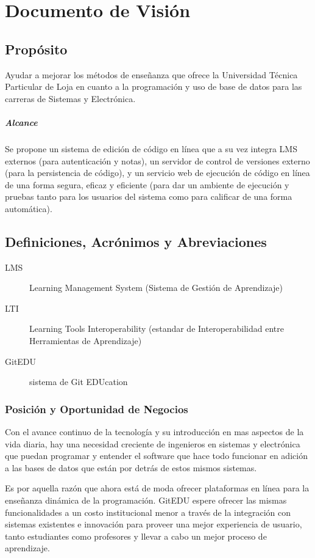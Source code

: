 

\chapter{Documento de Visión}
\label{visionDoc}

\section{Propósito}
Ayudar a mejorar los métodos de enseñanza que ofrece la Universidad Técnica Particular de Loja en cuanto a la programación y uso de base de datos para las carreras de Sistemas y Electrónica.
\paragraph{Alcance}
Se propone un sistema de edición de código en línea que a su vez integra LMS externos (para autenticación y notas), un servidor de control de versiones externo (para la persistencia de código), y un servicio web de ejecución de código en línea de una forma segura, eficaz y eficiente (para dar un ambiente de ejecución y pruebas tanto para los usuarios del sistema como para calificar de una forma automática).
\section{Definiciones, Acrónimos y Abreviaciones}
\begin{description}
	\item[LMS] Learning Management System (Sistema de Gestión de Aprendizaje)
    \item[LTI] Learning Tools Interoperability (estandar de Interoperabilidad entre Herramientas de Aprendizaje)
    \item[GitEDU] sistema de Git EDUcation
\end{description}
\subsection{Posición y Oportunidad de Negocios}
Con el avance continuo de la tecnología y su introducción en mas aspectos de la vida diaria, hay una necesidad creciente de ingenieros en sistemas y electrónica que puedan programar y entender el software que hace todo funcionar en adición a las bases de datos que están por detrás de estos mismos sistemas.
 
Es por aquella razón que ahora está de moda ofrecer plataformas en línea para la enseñanza dinámica de la programación. GitEDU espere ofrecer las mismas funcionalidades a un costo institucional menor a través de la integración con sistemas existentes e innovación para proveer una mejor experiencia de usuario, tanto estudiantes como profesores y llevar a cabo un mejor proceso de aprendizaje.

